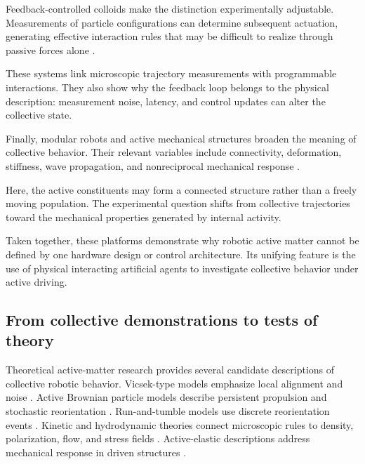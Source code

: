 Feedback-controlled
colloids make
the distinction
experimentally adjustable.
Measurements of
particle configurations
can determine subsequent
actuation, generating
effective interaction
rules that may be
difficult to realize
through passive
forces alone
\cite{Buerle2020formationofstable,Martinet2022rotationcontrolin,Chen2022collectiveresponse,Chen2024synchronousandfull,Chen2024persistentandrespo,Heuthe2025tunablecolloidalsw}.

These systems link
microscopic trajectory
measurements with
programmable interactions.
They also show
why the feedback
loop belongs
to the physical
description:
measurement noise,
latency, and
control updates
can alter the
collective state.

Finally, modular
robots and active
mechanical structures
broaden the meaning
of collective behavior.
Their relevant variables
include connectivity,
deformation, stiffness,
wave propagation,
and nonreciprocal
mechanical response
\cite{Li2019particleroboticsba,Savoie2019arobotmadeofrobo,Brandenbourger2019nonreciprocalrobot,Brandenbourger2021limitcyclesturnac,Baconnier2022tensioncontrolledc,Yang2024selfamputatingand,Coulais2025activemetamaterials,Binysh2026moreislessinunpe}.

Here, the active
constituents may
form a connected
structure rather
than a freely
moving population.
The experimental
question shifts
from collective
trajectories toward
the mechanical
properties generated
by internal activity.

Taken together,
these platforms
demonstrate why
robotic active matter
cannot be defined
by one hardware
design or control
architecture.
Its unifying feature
is the use of
physical interacting
artificial agents
to investigate
collective behavior
under active driving.

\subsection{From collective demonstrations to tests of theory}
\label{sec:introduction-tests}

Theoretical active-matter research provides several
candidate descriptions of collective robotic behavior.
Vicsek-type models emphasize local alignment and
noise
\cite{Vicsek1995novel}.
Active Brownian particle models describe
persistent propulsion and stochastic
reorientation
\cite{Bechinger2016active}.
Run-and-tumble models use discrete
reorientation events
\cite{Tailleur2008runtumble}.
Kinetic and hydrodynamic theories
connect microscopic rules
to density, polarization,
flow, and stress fields
\cite{Toner1995longrange}
\cite{Marchetti2013hydrodynamics}.
Active-elastic descriptions
address mechanical response
in driven structures
\cite{Scheibner2020odd}.


